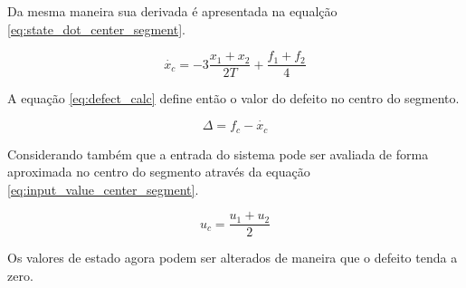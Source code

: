 Da mesma maneira sua derivada é apresentada na equalção \ref{eq:state_dot_center_segment}.

\begin{equation}
    \label{eq:state_dot_center_segment}
    \dot{x_{c}} = -3\frac{x_{1} + x_{2}}{2T} + \frac{f_{1} + f_{2}}{4}
\end{equation}

A equação \ref{eq:defect_calc} define então o valor do defeito no centro do segmento.

\begin{equation}
    \label{eq:defect_calc}
    \Delta = f_c - \dot{x_c}
\end{equation}

Considerando também que a entrada do sistema pode ser avaliada de forma aproximada no centro do segmento 
através da equação \ref{eq:input_value_center_segment}.

\begin{equation}
    \label{eq:input_value_center_segment}
    u_c = \frac{u_1 + u_2}{2}
\end{equation}

Os valores de estado agora podem ser alterados de maneira que o defeito tenda a zero.

